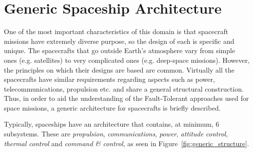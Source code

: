 \section{Generic Spaceship Architecture}
One of the most important characteristics of this domain is that spacecraft
missions have extremely diverse purpose, so the design of each is specific and
unique. The spacecrafts that go outside Earth's atmosphere vary from simple ones
(e.g. satellites) to very complicated ones (e.g. deep-space missions). However,
the principles on which their designs are based are common. Virtually all the
spacecrafts have similar requirements regarding aspects such as power,
telecommunications, propulsion etc. and share a general structural construction.
Thus, in order to aid the understanding of the Fault-Tolerant approaches used
for space missions, a generic architecture for spacecrafts is briefly described.

Typically, spaceships have an architecture that contains, at minimum, 6
subsystems\cite{ft-space-avionics}. These are \textit{propulsion},
\textit{communications}, \textit{power}, \textit{attitude control},
\textit{thermal control} and \textit{command \& control}, as seen in
Figure~\ref{fig:generic_structure}.


